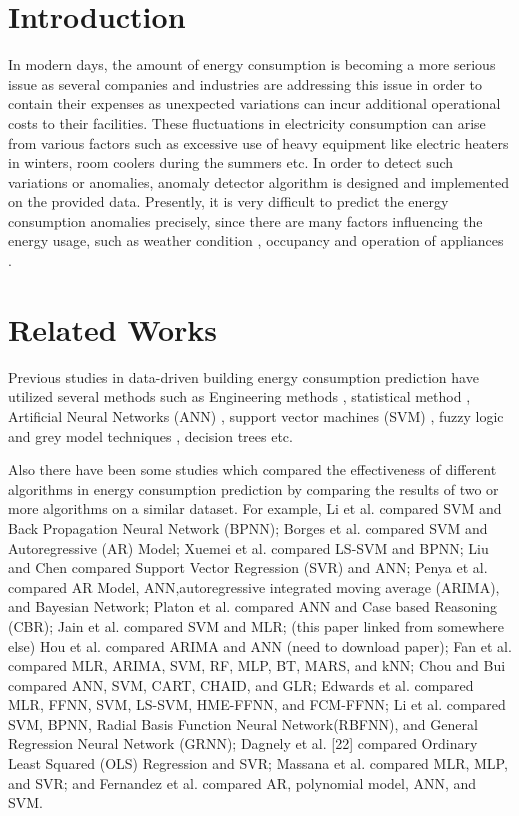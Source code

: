 \documentclass[conference]{IEEEtran}
\begin{document}

\section{Introduction}
In modern days, the amount of energy consumption is becoming a more serious issue as several companies and industries are addressing this issue in order to contain their expenses as unexpected variations can incur additional operational costs to their facilities. These fluctuations in electricity consumption can arise from various factors such as excessive use of heavy equipment like electric heaters in winters, room coolers during the summers etc. In order to detect such variations or anomalies, anomaly detector algorithm is designed and implemented on the provided data.
Presently, it is very difficult to predict the energy consumption anomalies precisely, since there are many factors influencing the energy usage, such as weather condition \cite{bb0},  occupancy \cite{bb1} and operation of appliances \cite{bb2,bb3}. 

\section{Related Works}

Previous studies in data-driven building energy consumption prediction have utilized several methods such as Engineering methods \cite{bb4}, statistical method \cite{bb5}, Artificial Neural Networks (ANN) \cite{bb6,bb7}, support vector machines (SVM) \cite{bb8}, fuzzy logic and grey model techniques \cite{bb9}, decision trees \cite{bb10} etc. 

Also there have been some studies which compared the effectiveness of different algorithms in energy consumption prediction by comparing the results of two or more algorithms on a similar dataset. For example, Li et al. \cite{bb8} compared SVM and Back Propagation Neural Network (BPNN); Borges et al. \cite{bb11} compared SVM and Autoregressive (AR) Model; Xuemei et al. \cite{bb12}  compared LS-SVM and BPNN; Liu and Chen \cite{bb13}  compared Support Vector Regression (SVR) and ANN; Penya et al. \cite{bb14}  compared AR Model, ANN,autoregressive integrated moving average (ARIMA), and Bayesian Network; Platon et al. \cite{bb15}  compared ANN and Case based Reasoning (CBR); Jain et al. \cite{bb16} compared SVM and MLR; (this paper linked from somewhere else) Hou et al. \cite{bb17}  compared ARIMA and ANN (need to download paper);  Fan et al. \cite{bb18}  compared MLR, ARIMA, SVM, RF, MLP, BT, MARS, and kNN; Chou and Bui \cite{bb19}  compared ANN, SVM, CART, CHAID, and GLR; Edwards et al. \cite{bb20}  compared MLR, FFNN, SVM, LS-SVM, HME-FFNN, and FCM-FFNN; Li et al. \cite{bb21,bb22} compared SVM, BPNN, Radial Basis Function Neural Network(RBFNN), and General Regression Neural Network (GRNN); Dagnely et al. \cite{bb23} [22] compared Ordinary Least Squared (OLS) Regression and SVR; Massana et al. \cite{bb24} compared MLR, MLP, and SVR; and Fernandez et al. \cite{bb25}  compared AR, polynomial model, ANN, and SVM.
\end{document}
